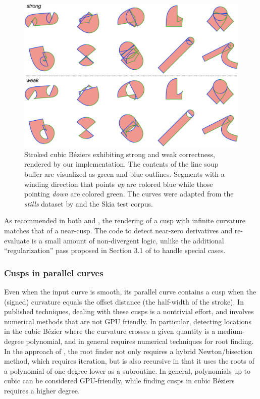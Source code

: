 \documentclass[sigconf, nonacm]{acmart}
\begin{document}
\begin{figure}
    \includegraphics[scale=0.19]{stroke_stills}
    \caption{Stroked cubic Béziers exhibiting strong and weak correctness, rendered by our implementation. The contents of the line soup buffer are visualized as green and blue outlines. Segments with a winding direction that points \emph{up} are colored blue while those pointing \emph{down} are colored green. The curves were adapted from the \emph{stills} dataset by \citet{Nehab2020} and the Skia test corpus.}
    \label{fig:stroke_stills}
\end{figure}

As recommended in both \citet{Nehab2020} and \citet{Kilgard2020}, the rendering of a cusp with infinite curvature matches that of a near-cusp. The code to detect near-zero derivatives and re-evaluate is a small amount of non-divergent logic, unlike the additional ``regularization'' pass proposed in Section 3.1 of \citet{Nehab2020} to handle special cases.

\subsubsection{Cusps in parallel curves}

Even when the input curve is smooth, its parallel curve contains a cusp when the (signed) curvature equals the offset distance (the half-width of the stroke). In published techniques, dealing with these cusps is a nontrivial effort, and involves numerical methods that are not GPU friendly. In particular, detecting locations in the cubic Bézier where the curvature crosses a given quantity is a medium-degree polynomial, and in general requires numerical techniques for root finding. In the approach of \citet{Nehab2020}, the root finder not only requires a hybrid Newton/bisection method, which requires iteration, but is also recursive in that it uses the roots of a polynomial of one degree lower as a subroutine. In general, polynomials up to cubic can be considered GPU-friendly, while finding cusps in cubic Béziers requires a higher degree.
\end{document}

